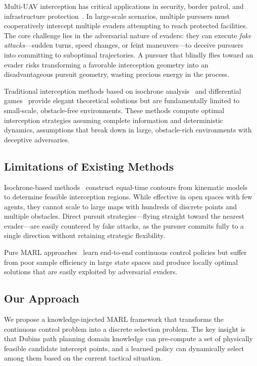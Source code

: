 \documentclass[10pt,conference]{IEEEtran}
\begin{document}
Multi-UAV interception has critical applications in security, border patrol, and infrastructure protection~\cite{vidal2002probabilistic,hespanha1999multiple}. In large-scale scenarios, multiple pursuers must cooperatively intercept multiple evaders attempting to reach protected facilities. The core challenge lies in the adversarial nature of evaders: they can execute \emph{fake attacks}---sudden turns, speed changes, or feint maneuvers---to deceive pursuers into committing to suboptimal trajectories. A pursuer that blindly flies toward an evader risks transforming a favorable interception geometry into an disadvantageous pursuit geometry, wasting precious energy in the process.

Traditional interception methods based on isochrone analysis~\cite{shima2011optimal,isochron2024} and differential games~\cite{tad2018,homicidal2015} provide elegant theoretical solutions but are fundamentally limited to small-scale, obstacle-free environments. These methods compute optimal interception strategies assuming complete information and deterministic dynamics, assumptions that break down in large, obstacle-rich environments with deceptive adversaries.

\subsection{Limitations of Existing Methods}

Isochrone-based methods~\cite{shima2011optimal,isochron2024} construct equal-time contours from kinematic models to determine feasible interception regions. While effective in open spaces with few agents, they cannot scale to large maps with hundreds of discrete points and multiple obstacles. Direct pursuit strategies---flying straight toward the nearest evader---are easily countered by fake attacks, as the pursuer commits fully to a single direction without retaining strategic flexibility.

Pure MARL approaches~\cite{yu2022surprising,chen2025online} learn end-to-end continuous control policies but suffer from poor sample efficiency in large state spaces and produce locally optimal solutions that are easily exploited by adversarial evaders.

\subsection{Our Approach}

We propose a knowledge-injected MARL framework that transforms the continuous control problem into a discrete selection problem. The key insight is that Dubins path planning domain knowledge can pre-compute a set of physically feasible candidate intercept points, and a learned policy can dynamically select among them based on the current tactical situation.
\end{document}
